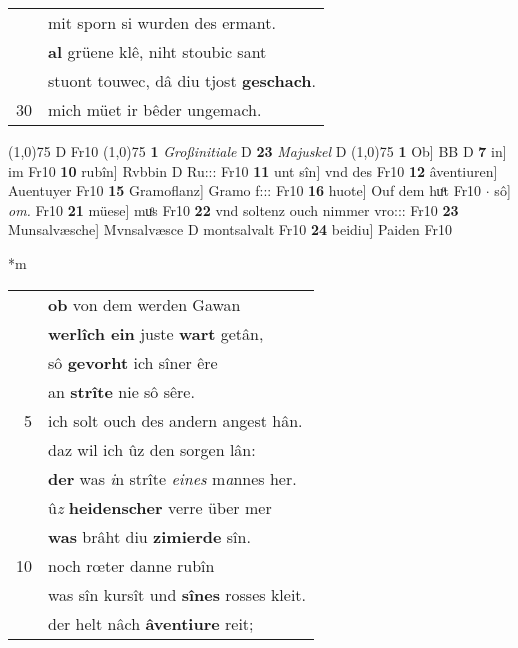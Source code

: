 \documentclass[8pt,a4paper,notitlepage]{article}
\begin{document}
\begin{table}[ht]
\begin{minipage}[t]{0.5\linewidth}
\begin{tabular}{rl}
 & mit sporn si wurden des ermant.\\ 
 & \textbf{al} grüene klê, niht stoubic sant\\ 
 & stuont touwec, dâ diu tjost \textbf{geschach}.\\ 
30 & mich müet ir bêder ungemach.\\ 
\end{tabular}
\scriptsize
\line(1,0){75} \newline
D Fr10 \newline
\line(1,0){75} \newline
\textbf{1} \textit{Großinitiale} D  \textbf{23} \textit{Majuskel} D  \newline
\line(1,0){75} \newline
\textbf{1} Ob] BB D \textbf{7} in] im Fr10 \textbf{10} rubîn] Rvbbin D Ru::: Fr10 \textbf{11} unt sîn] vnd des Fr10 \textbf{12} âventiuren] Auentuyer Fr10 \textbf{15} Gramoflanz] Gramo f::: Fr10 \textbf{16} huote] Ouf dem huͦt Fr10  $\cdot$ sô] \textit{om.} Fr10 \textbf{21} müese] muͦs Fr10 \textbf{22} vnd soltenz ouch nimmer vro::: Fr10 \textbf{23} Munsalvæsche] Mvnsalvæsce D montsalvalt Fr10 \textbf{24} beidiu] Paiden Fr10 \newline
\end{minipage}
\hspace{0.5cm}
\begin{minipage}[t]{0.5\linewidth}
\small
\begin{center}*m
\end{center}
\begin{tabular}{rl}
 & \textbf{ob} von dem werden Gawan\\ 
 & \textbf{werlîch ein} juste \textbf{wart} getân,\\ 
 & sô \textbf{gevorht} ich sîner êre\\ 
 & an \textbf{strîte} nie sô sêre.\\ 
5 & ich solt ouch des andern angest hân.\\ 
 & daz wil ich ûz den sorgen lân:\\ 
 & \textbf{der} was \textit{i}n strîte \textit{eines} m\textit{a}nnes her.\\ 
 & û\textit{z} \textbf{heidenscher} verre über mer\\ 
 & \textbf{was} brâht diu \textbf{zimierde} sîn.\\ 
10 & noch rœter danne rubîn\\ 
 & was sîn kursît und \textbf{sînes} rosses kleit.\\ 
 & der helt nâch \textbf{âventiure} reit;\\ 

\end{tabular}
\end{minipage}
\end{table}
\end{document}
